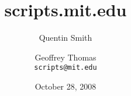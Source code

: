 \documentclass{beamer}
\title{scripts.mit.edu}
\author{Quentin Smith \and Geoffrey Thomas \\ \texttt{scripts@mit.edu}}
\institute{Student Information Processing Board}
\date{October 28, 2008}
\begin{document}
\begin{frame}
    \titlepage
\end{frame}













\end{document}

